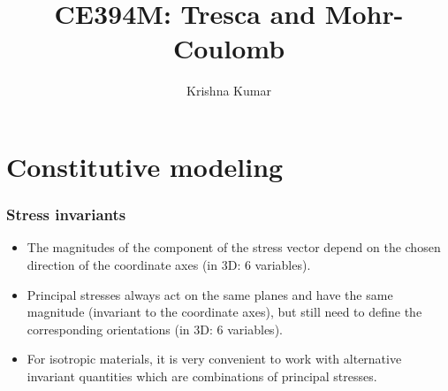 \documentclass[notes]{beamer}
\title[CE394M: Tresca \& MC]{CE394M: Tresca and Mohr-Coulomb}
\author{Krishna Kumar} %
\institute[UT Austin] %
{
University of Texas at Austin \\
\medskip
\textit{
  \url{krishnak@utexas.edu}} %
}
\date{} %
\begin{document}
\begin{frame}
\titlepage %
\end{frame}



\section{Constitutive modeling}
\begin{frame}
\frametitle{Stress invariants}
\begin{itemize}
	\item The magnitudes of the component of the stress vector depend on the chosen direction of the coordinate axes (in 3D: 6 variables).
	\item Principal stresses always act on the same planes and have the same magnitude (invariant to the coordinate axes), but still need to define the corresponding orientations (in 3D: 6 variables).
	\item For isotropic materials, it is very convenient to work with alternative invariant quantities which are combinations of principal stresses.
\end{itemize}
\end{frame}
\end{document}
